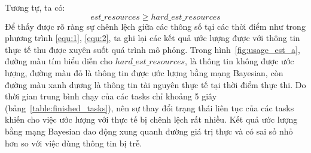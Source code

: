 \documentclass{my_style}
\begin{document}
Tương tự, ta có:
\begin{equation} \label{equ:2}
	est\_resources \geq hard\_est\_resources
\end{equation}
Để thấy được rõ ràng sự chênh lệch giữa các thông số tại các thời điểm như trong phương trình \ref{equ:1}, \ref{equ:2}, ta ghi lại các kết quả ước lượng được với thông tin thực tế thu được xuyên suốt quá trình mô phỏng.
Trong hình~\ref{fig:usage_est_a}, đường màu tím biểu diễn cho $hard\_est\_resources$, là thông tin không được ước lượng,
đường màu đỏ là thông tin được ước lượng bằng mạng Bayesian, còn đường màu xanh dương là thông tin tài nguyên thực tế tại thời điểm thực thi. Do thời gian trung bình chạy của các tasks chỉ khoảng 5 giây (bảng~\ref{table:finished_tasks}), nên sự thay đổi trạng thái liên tục của các tasks khiến cho việc ước lượng với thực tế bị chênh lệch rất nhiều. Kết quả ước lượng bằng mạng Bayesian dao động xung quanh đường giá trị thực và có sai số nhỏ hơn so với việc dùng thông tin bị trễ. 
\end{document}

